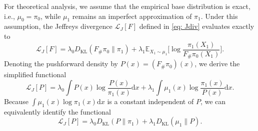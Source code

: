 \documentclass[%
 reprint,
 amsmath,amssymb,
 aps,
 pre,
]{revtex4-2}
\DeclareMathOperator{\KL}{KL}
\newcommand{\D}{\mathrm{d}}
\begin{document}
For theoretical analysis, we assume that the empirical base distribution is exact, i.e., $\mu_0 = \pi_0$, while $\mu_1$ remains an imperfect approximation of $\pi_1$.
Under this assumption, the Jeffreys divergence $\mathcal L_J[F]$ defined in \eqref{eq: Jdiv} evaluates exactly to
\begin{equation*}
	\mathcal L_J[F] = \lambda_0 D_{\KL}(F_\#\pi_0\|\pi_1) + 
	\lambda_1 \mathbb E_{X_1\sim \mu_1} 
	\bigg[\log\frac{\pi_1(X_1)}{F_\#\pi_0(X_1)}\bigg].
\end{equation*}
Denoting the pushforward density by $P(x) = (F_\#\pi_0)(x)$, we derive the simplified functional
\begin{equation*}
	\mathcal L_J[P] =  \lambda_0 \int P(x) \log \frac{P(x)}{\pi_1(x)}\D x + \lambda_1 \int \mu_1(x)\log \frac{\pi_1(x)}{P(x)}\D x.
\end{equation*}
Because $\int \mu_1(x) \log \pi_1(x)\D x$ is a constant independent of $P$, we can equivalently identify the functional
\begin{equation}
	\mathcal L_J[P] = \lambda_0 D_{\KL}(P\|\pi_1) + \lambda_1 D_{\KL}(\mu_1\|P).
	\label{eq: LJP}
\end{equation}
\end{document}
